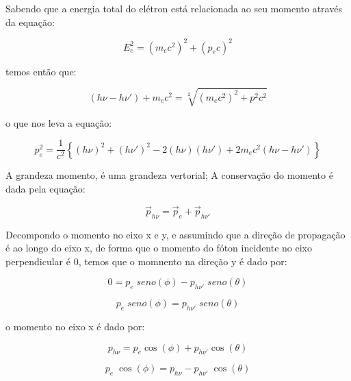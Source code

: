 \documentclass[11pt,a4paper]{article}
\begin{document}
            
            \noindent Sabendo que a energia total do elétron está relacionada ao seu momento através da equação:

                \begin{equation}
                    E_e^2 = (m_ec^2)^2 + (p_ec)^2
                \end{equation}

            \noindent temos então que:

                \begin{equation}
                    (h\nu - h\nu') + m_ec^2 = \sqrt[2]{(m_ec^2)^2 + p^2 c^2}
                \end{equation}

            \noindent o que nos leva a equação:

                \begin{equation}
                    p_e^2 = \frac{1}{c^2} \left\{ (h\nu)^2 + (h\nu')^2 - 2 (h\nu)(h\nu') + 2m_ec^2(h\nu - h\nu')\right\}
                    \label{eq:momentoConserEner}
                \end{equation}

            \noindent A grandeza momento, é uma grandeza vertorial; A conservação do momento é dada pela equação:

                \begin{equation}
                    \vec{p}_{h\nu} = \vec{p}_e + \vec{p}_{h\nu'}
                 \end{equation}

            \noindent Decompondo o momento no eixo x e y, e assumindo que a direção de propagação é ao longo do eixo x, de forma que o momento do fóton incidente no eixo perpendicular é 0, temos que o momnento na direção y é dado por:

                 $$0 = p_e \; seno(\phi) - p_{h\nu'} \; seno(\theta)$$

                 \begin{equation}
                    p_e \; seno(\phi) = p_{h\nu'} \; seno(\theta)
                 \end{equation}

            \noindent o momento no eixo x é dado por:

                 $$p_{h\nu} = p_e \cos(\phi) + p_{h\nu'} \cos(\theta)$$

                 \begin{equation}
                    p_e \; \cos(\phi) = p_{h\nu} - p_{h\nu'} \; \cos(\theta)
                 \end{equation}
\end{document}
